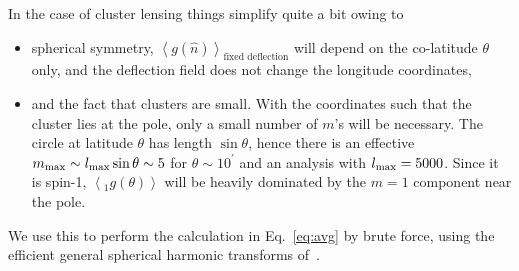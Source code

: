 \documentclass[prd, superscriptaddress, tightenlines, longbibliography, nofootinbib, eqsecnum, amsfonts, amsmath, floatfix, twocolumn, notitlepage]{revtex4-2}
\newcommand{\LL}[1]{{\color{orange}{LL: #1}}}
\newcommand{\av}[1]{\left \langle #1\right\rangle}
\begin{document}
In the case of cluster lensing things simplify quite a bit owing to
\begin{itemize}
	\item  spherical symmetry, $\av{g(\hat n)}_{\textrm{fixed deflection}}$ will depend on the co-latitude $\theta$ only, and the deflection field does not change the longitude coordinates,
	\item and the fact that clusters are small. With the coordinates such that the cluster lies at the pole, only a small number of $m$'s will be necessary. The circle at latitude $\theta$ has length $\sin \theta$, hence there is an effective $m_{\rm max} \sim l_{\rm max} \sin \theta \sim 5$ for $\theta \sim 10^{'}$ and an analysis with $l_{\rm max} = 5000$. 
	Since it is spin-1, $\av{_1g(\theta)}$ will be heavily dominated by the $m = 1$ component near the pole.
\end{itemize}
We use this to perform the calculation in Eq.~\eqref{eq:avg} by brute force, using the efficient general spherical harmonic transforms of~\cite{Reinecke:2023gtp}.

\LL{what do you do then to get the mass bias? I dont understand}
\LL{Because it is for fixed deflection, do you have a N0 bias?}
\end{document}
